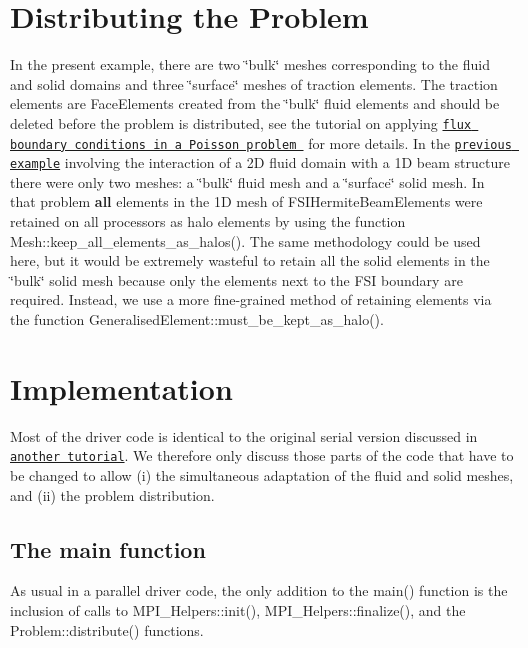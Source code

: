 \hypertarget{index_distr}{}\section{Distributing the Problem}\label{index_distr}
In the present example, there are two \char`\"{}bulk\char`\"{} meshes corresponding to the fluid and solid domains and three \char`\"{}surface\char`\"{} meshes of traction elements. The traction elements are {\ttfamily Face\+Elements} created from the \char`\"{}bulk\char`\"{} fluid elements and should be deleted before the problem is distributed, see the tutorial on applying \href{../../two_d_poisson_flux_bc_adapt/html/index.html}{\tt flux boundary conditions in a Poisson problem } for more details. In the \href{../../fsi_channel_with_leaflet/html/index.html}{\tt previous example} involving the interaction of a 2D fluid domain with a 1D beam structure there were only two meshes\+: a \char`\"{}bulk\char`\"{} fluid mesh and a \char`\"{}surface\char`\"{} solid mesh. In that problem {\bfseries all} elements in the 1D mesh of {\ttfamily F\+S\+I\+Hermite\+Beam\+Elements} were retained on all processors as halo elements by using the function {\ttfamily Mesh\+::keep\+\_\+all\+\_\+elements\+\_\+as\+\_\+halos()}. The same methodology could be used here, but it would be extremely wasteful to retain all the solid elements in the \char`\"{}bulk\char`\"{} solid mesh because only the elements next to the F\+SI boundary are required. Instead, we use a more fine-\/grained method of retaining elements via the function {\ttfamily Generalised\+Element\+::must\+\_\+be\+\_\+kept\+\_\+as\+\_\+halo()}.



 

\hypertarget{index_impl}{}\section{Implementation}\label{index_impl}
Most of the driver code is identical to the original serial version discussed in \href{../../fsi_channel_with_leaflet/html/index.html}{\tt another tutorial}. We therefore only discuss those parts of the code that have to be changed to allow (i) the simultaneous adaptation of the fluid and solid meshes, and (ii) the problem distribution.



\hypertarget{index_main_body}{}\subsection{The main function}\label{index_main_body}
As usual in a parallel driver code, the only addition to the {\ttfamily main()} function is the inclusion of calls to {\ttfamily M\+P\+I\+\_\+\+Helpers\+::init()}, {\ttfamily M\+P\+I\+\_\+\+Helpers\+::finalize()}, and the {\ttfamily Problem\+::distribute()} functions.



